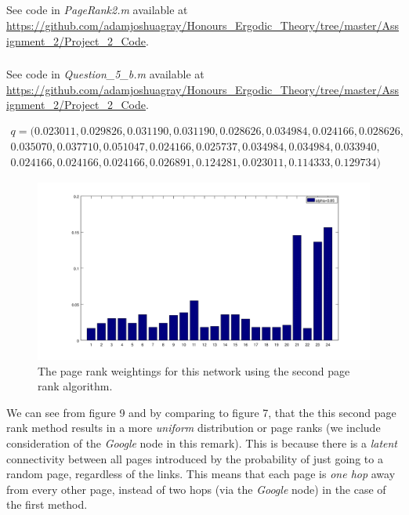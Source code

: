 \documentclass{unswmaths}
\begin{document}
\subsection{}
\subsubsection{}
See code in \emph{PageRank2.m} available at \url{https://github.com/adamjoshuagray/Honours_Ergodic_Theory/tree/master/Assignment_2/Project_2_Code}. 
\subsubsection{}
See code in \emph{Question\_5\_b.m} available at \url{https://github.com/adamjoshuagray/Honours_Ergodic_Theory/tree/master/Assignment_2/Project_2_Code}. 

\begin{align*}
    q = (
   0.023011,
   0.029826,
   0.031190,
   0.031190,
   0.028626,
   0.034984,
   0.024166,
   0.028626, \\
   0.035070,
   0.037710,
   0.051047,
   0.024166,
   0.025737,
   0.034984,
   0.034984,
   0.033940, \\
   0.024166,
   0.024166,
   0.024166,
   0.026891,
   0.124281,
   0.023011,
   0.114333,
   0.129734
)
\end{align*}
\begin{figure}[h]
    \includegraphics[scale=0.4]{Second_Rank}
    \caption{The page rank weightings for this network using the second page rank algorithm.}
\end{figure}


We can see from figure 9 and by comparing to figure 7, that the this second page rank method results in a more \emph{uniform} distribution or page ranks (we include consideration of the \emph{Google} node in this remark). This is because there is a \emph{latent} connectivity between all pages introduced by the probability of just going to a random page, regardless of the links. This means that each page is \emph{one hop} away from every other page, instead of two hops (via the \emph{Google} node) in the case of the first method. 
\end{document}
